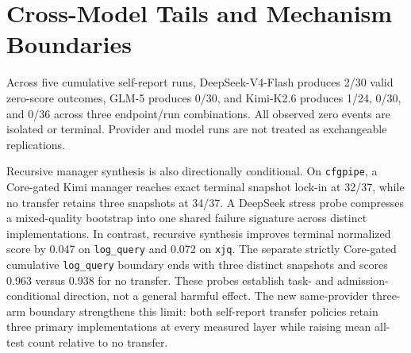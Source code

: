 \documentclass[letterpaper]{article}
\begin{document}
\begin{table}[t]
\centering
\caption{Retrospective local-gate threshold replay.}
\label{tab:supp-thresholds}
\small
{}
\end{table}

\section{Cross-Model Tails and Mechanism Boundaries}

Across five cumulative self-report runs, DeepSeek-V4-Flash produces 2/30
valid zero-score outcomes, GLM-5 produces 0/30, and Kimi-K2.6 produces 1/24,
0/30, and 0/36 across three endpoint/run combinations. All observed zero
events are isolated or terminal. Provider and model runs are not treated as
exchangeable replications.

Recursive manager synthesis is also directionally conditional. On
\texttt{cfgpipe}, a Core-gated Kimi manager reaches exact terminal snapshot
lock-in at 32/37, while no transfer retains three snapshots at 34/37. A
DeepSeek stress probe compresses a mixed-quality bootstrap into one shared
failure signature across distinct implementations. In contrast, recursive
synthesis improves terminal normalized score by 0.047 on
\texttt{log\_query} and 0.072 on \texttt{xjq}. The separate strictly
Core-gated cumulative \texttt{log\_query} boundary ends with three distinct
snapshots and scores 0.963 versus 0.938 for no transfer. These probes establish
task- and admission-conditional direction, not a general harmful effect. The new
same-provider three-arm boundary strengthens this limit: both self-report transfer
policies retain three primary implementations at every measured layer while
raising mean all-test count relative to no transfer.
\end{document}
